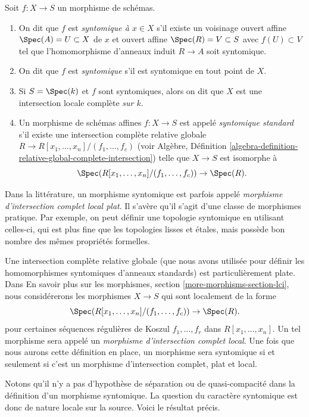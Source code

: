 \begin{definition}
\label{definition-syntomic}
Soit $f : X \to S$ un morphisme de schémas.
\begin{enumerate}
\item On dit que $f$ est {\it syntomique
à $x \in X$} s'il existe un voisinage ouvert affine $\Spec(A) = U \subset X$
de $x$ et ouvert affine $\Spec(R) = V \subset S$ avec
$f(U) \subset V$ tel que l'homomorphisme d'anneaux induit $R \to A$
soit syntomique.
\item On dit que $f$ est {\it syntomique} s'il est syntomique
en tout point de $X$.
\item Si $S = \Spec(k)$ et $f$ sont syntomiques, alors on dit que $X$ est une intersection
locale complète {\it sur $k$}.
\item Un morphisme de schémas affines $f : X \to S$
est appelé {\it syntomique
standard} s'il
existe une intersection complète relative
globale
$R \to R[x_1, \ldots, x_n]/(f_1, \ldots, f_c)$ (voir Algèbre, Définition \ref{algebra-definition-relative-global-complete-intersection}) telle que
$X \to S$ est isomorphe à
$$
\Spec(R[x_1, \ldots, x_n]/(f_1, \ldots, f_c)) \to \Spec(R).
$$
\end{enumerate}
\end{definition}

\noindent
Dans la littérature, un morphisme syntomique est parfois appelé {\it
morphisme d'intersection complet local plat}. Il
s’avère qu’il s’agit d’une classe de morphismes pratique. Par exemple, on peut définir
une topologie syntomique en utilisant celles-ci, qui est plus fine que les topologies
lisses et étales, mais possède bon nombre des mêmes propriétés formelles.

\medskip\noindent Une
intersection complète relative globale (que nous avons utilisée pour définir les homomorphismes
syntomiques d'anneaux standards) est particulièrement
plate. Dans En savoir plus sur les morphismes, section \ref{more-morphisms-section-lci},
nous considérerons les morphismes $X \to S$ qui sont localement de la forme
$$
\Spec(R[x_1, \ldots, x_n]/(f_1, \ldots, f_c)) \to \Spec(R).
$$
pour certaines séquences régulières de Koszul $f_1, \ldots, f_r$ dans $R[x_1, \ldots, x_n]$. Un tel morphisme
sera appelé un {\it morphisme d'intersection complet local}.
Une fois que nous aurons cette définition en place, un morphisme sera syntomique
si et seulement si c'est un morphisme d'intersection complet, plat et local.

\medskip\noindent Notons
qu'il n'y a pas d'hypothèse de séparation ou de quasi-compacité dans la
définition d'un morphisme syntomique. La question du caractère syntomique est
donc de nature locale sur la source. Voici le résultat précis.

